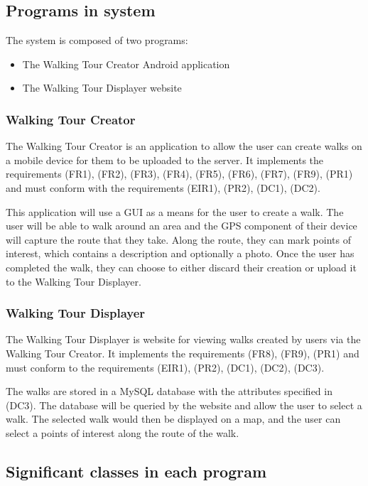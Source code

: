 \documentclass{project}
\begin{document}
\subsection{Programs in system}
The system is composed of two programs:
\begin{itemize}
\item The Walking Tour Creator Android application
\item The Walking Tour Displayer website
\end{itemize}


\subsubsection{Walking Tour Creator}
The Walking Tour Creator is an application to allow the user can create walks
on a mobile device for them to be uploaded to the server. It implements the
requirements (FR1), (FR2), (FR3), (FR4), (FR5), (FR6), (FR7), (FR9), (PR1) and
must conform with the requirements (EIR1), (PR2), (DC1), (DC2).\cite{se.qa.rs}

This application will use a GUI as a means for the user to create a walk. The
user will be able to walk around an area and the GPS component of their device
will capture the route that they take. Along the route, they can mark points of
interest, which contains a description and optionally a photo. Once the user
has completed the walk, they can choose to either discard their creation or
upload it to the Walking Tour Displayer.

\subsubsection{Walking Tour Displayer}
The Walking Tour Displayer is website for viewing walks created by users via
the Walking Tour Creator. It implements the requirements (FR8), (FR9), (PR1)
and must conform to the requirements (EIR1), (PR2), (DC1), (DC2),
(DC3).\cite{se.qa.rs}

The walks are stored in a MySQL database with the attributes specified in
(DC3). The database will be queried by the website and allow the user to select
a walk. The selected walk would then be displayed on a map, and the user can
select a points of interest along the route of the walk.

\newpage

\subsection{Significant classes in each program}
\end{document}
